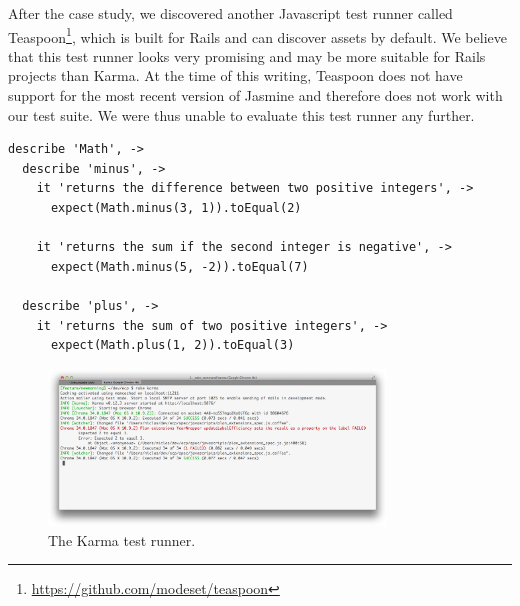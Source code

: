 After the case study, we discovered another Javascript test runner
called Teaspoon\footnote{\url{https://github.com/modeset/teaspoon}},
which is built for Rails and can discover assets by default. We believe
that this test runner looks very promising and may be more suitable for
Rails projects than Karma. At the time of this writing, Teaspoon does
not have support for the most recent version of Jasmine and therefore
does not work with our test suite. We were thus unable to evaluate this
test runner any further.\\

\begin{lstlisting}[caption=Example of Jasmine tests for a module (compare with code listing \ref{lst:rspec}).,
                   label=lst:jasmine, float=t, language=HTML]
describe 'Math', ->
  describe 'minus', ->
    it 'returns the difference between two positive integers', ->
      expect(Math.minus(3, 1)).toEqual(2)

    it 'returns the sum if the second integer is negative', ->
      expect(Math.minus(5, -2)).toEqual(7)

  describe 'plus', ->
    it 'returns the sum of two positive integers', ->
      expect(Math.plus(1, 2)).toEqual(3)
\end{lstlisting}

\begin{figure}
\centering
\includegraphics[width=0.8\textwidth]{results/choices/karma_runner}
\caption{The Karma test runner.}
\label{fig:karma_runner}
\end{figure}
